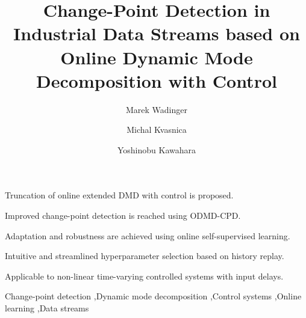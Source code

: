 \documentclass[preprint,12pt,authoryear]{elsarticle}
\begin{document}
\begin{frontmatter}


	\title{Change-Point Detection in Industrial Data Streams based on Online Dynamic Mode Decomposition with Control}

	\author[aff1,aff2]{Marek Wadinger}

	\author[aff1]{Michal Kvasnica}

	\author[aff2]{Yoshinobu Kawahara}



	\begin{abstract}
		
	\end{abstract}


	\begin{highlights}
		\item Truncation of online extended DMD with control is proposed.
		\item Improved change-point detection is reached using ODMD-CPD\@.
		\item Adaptation and robustness are achieved using online self-supervised learning.
		\item Intuitive and streamlined hyperparameter selection based on history replay.
		\item Applicable to non-linear time-varying controlled systems with input delays.
	\end{highlights}


	\begin{keyword}
		Change-point detection
		\sep{Dynamic mode decomposition}
		\sep{Control systems}
		\sep{Online learning}
		\sep{Data streams}
	\end{keyword}

\end{frontmatter}
\end{document}
